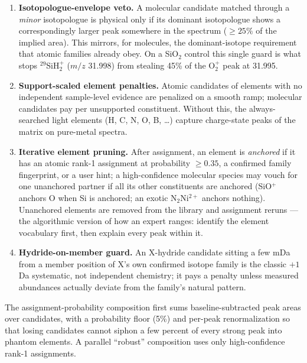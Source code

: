 \documentclass[11pt]{article}
\begin{document}
\begin{enumerate}
\item \textbf{Isotopologue-envelope veto.} A molecular candidate matched
through a \emph{minor} isotopologue is physical only if its dominant
isotopologue shows a correspondingly larger peak somewhere in the
spectrum ($\geq 25\%$ of the implied area). This mirrors, for molecules,
the dominant-isotope requirement that atomic families already obey. On a
SiO$_2$ control this single guard is what stops
$^{29}$SiH$_2^+$ ($m/z$ 31.998) from stealing 45\% of the O$_2^+$ peak at
31.995.
\item \textbf{Support-scaled element penalties.} Atomic candidates of
elements with no independent sample-level evidence are penalized on a
smooth ramp; molecular candidates pay per unsupported constituent.
Without this, the always-searched light elements (H, C, N, O, B, \dots)
capture charge-state peaks of the matrix on pure-metal spectra.
\item \textbf{Iterative element pruning.} After assignment, an element is
\emph{anchored} if it has an atomic rank-1 assignment at probability
$\geq0.35$, a confirmed family fingerprint, or a user hint; a
high-confidence molecular species may vouch for one unanchored partner if
all its other constituents are anchored (SiO$^+$ anchors O when Si is
anchored; an exotic N$_2$Ni$^{2+}$ anchors nothing). Unanchored elements
are removed from the library and assignment reruns --- the algorithmic
version of how an expert ranges: identify the element vocabulary first,
then explain every peak within it.
\item \textbf{Hydride-on-member guard.} An X-hydride candidate sitting a
few mDa from a member position of X's own confirmed isotope family is
the classic $+1$\,Da systematic, not independent chemistry; it pays a
penalty unless measured abundances actually deviate from the family's
natural pattern.
\end{enumerate}

The assignment-probability composition first sums baseline-subtracted peak
areas over candidates, with a probability floor (5\%) and per-peak
renormalization so that losing candidates cannot siphon a few percent of
every strong peak into phantom elements. A parallel ``robust'' composition
uses only high-confidence rank-1 assignments.
\end{document}
